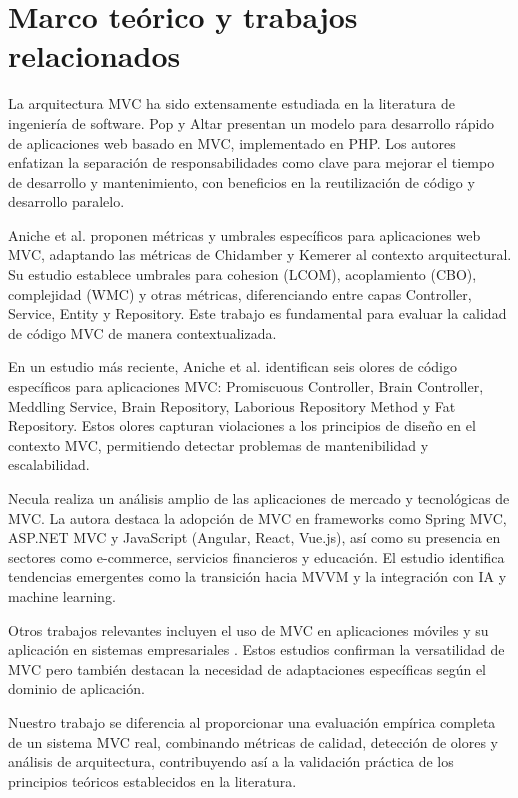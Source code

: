 \section{Marco teórico y trabajos relacionados}

La arquitectura MVC ha sido extensamente estudiada en la literatura de ingeniería de software. Pop y Altar \cite{pop2014designing} presentan un modelo para desarrollo rápido de aplicaciones web basado en MVC, implementado en PHP. Los autores enfatizan la separación de responsabilidades como clave para mejorar el tiempo de desarrollo y mantenimiento, con beneficios en la reutilización de código y desarrollo paralelo.

Aniche et al. \cite{aniche2016satt} proponen métricas y umbrales específicos para aplicaciones web MVC, adaptando las métricas de Chidamber y Kemerer al contexto arquitectural. Su estudio establece umbrales para cohesion (LCOM), acoplamiento (CBO), complejidad (WMC) y otras métricas, diferenciando entre capas Controller, Service, Entity y Repository. Este trabajo es fundamental para evaluar la calidad de código MVC de manera contextualizada.

En un estudio más reciente, Aniche et al. \cite{aniche2018code} identifican seis olores de código específicos para aplicaciones MVC: Promiscuous Controller, Brain Controller, Meddling Service, Brain Repository, Laborious Repository Method y Fat Repository. Estos olores capturan violaciones a los principios de diseño en el contexto MVC, permitiendo detectar problemas de mantenibilidad y escalabilidad.

Necula \cite{necula2024exploring} realiza un análisis amplio de las aplicaciones de mercado y tecnológicas de MVC. La autora destaca la adopción de MVC en frameworks como Spring MVC, ASP.NET MVC y JavaScript (Angular, React, Vue.js), así como su presencia en sectores como e-commerce, servicios financieros y educación. El estudio identifica tendencias emergentes como la transición hacia MVVM y la integración con IA y machine learning.


Otros trabajos relevantes incluyen el uso de MVC en aplicaciones móviles \cite{narsoo2009application} y su aplicación en sistemas empresariales \cite{zhao2010design}. Estos estudios confirman la versatilidad de MVC pero también destacan la necesidad de adaptaciones específicas según el dominio de aplicación.

Nuestro trabajo se diferencia al proporcionar una evaluación empírica completa de un sistema MVC real, combinando métricas de calidad, detección de olores y análisis de arquitectura, contribuyendo así a la validación práctica de los principios teóricos establecidos en la literatura.